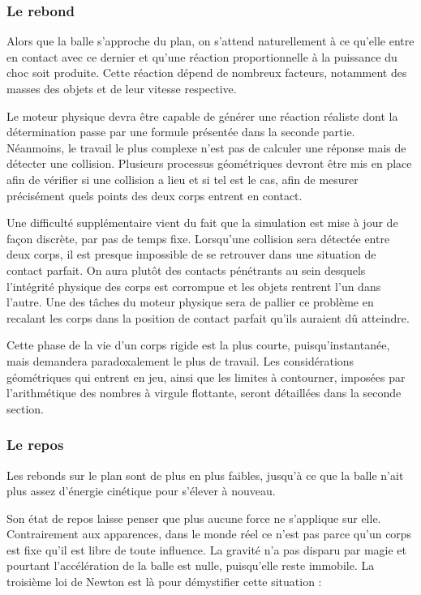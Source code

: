 \subsubsection{Le rebond}

Alors que la balle s'approche du plan, on s'attend
naturellement à ce qu'elle entre en contact avec ce dernier et qu'une
réaction proportionnelle à la puissance du choc soit produite. Cette
réaction dépend de nombreux facteurs, notamment des masses des objets
et de leur vitesse respective.

Le moteur physique devra être capable de générer une réaction réaliste
dont la détermination passe par une formule présentée dans la seconde
partie. Néanmoins, le travail le plus complexe n'est pas de calculer
une réponse mais de détecter une collision. Plusieurs processus
géométriques devront être mis en place afin de vérifier si une
collision a lieu et si tel est le cas, afin de mesurer précisément
quels points des deux corps entrent en contact.

Une difficulté supplémentaire vient du fait que la simulation est mise
à jour de façon discrète, par pas de temps fixe. Lorsqu'une collision
sera détectée entre deux corps, il est presque impossible de se
retrouver dans une situation de contact parfait. On aura plutôt des
contacts pénétrants au sein desquels l'intégrité physique des corps
est corrompue et les objets rentrent l'un dans l'autre. Une des tâches
du moteur physique sera de pallier ce problème en recalant les corps
dans la position de contact parfait qu'ils auraient dû atteindre.

Cette phase de la vie d'un corps rigide est la plus courte,
puisqu'instantanée, mais demandera paradoxalement le plus de
travail. Les considérations géométriques qui entrent en jeu, ainsi que
les limites à contourner, imposées par l'arithmétique des nombres à
virgule flottante, seront détaillées dans la seconde section.

\subsubsection{Le repos}

Les rebonds sur le plan sont de plus en plus faibles, jusqu'à ce que
la balle n'ait plus assez d'énergie cinétique pour s'élever à
nouveau.

Son état de repos laisse penser que plus aucune force ne s'applique
sur elle. Contrairement aux apparences, dans le monde réel ce n'est
pas parce qu'un corps est fixe qu'il est libre de toute influence. La
gravité n'a pas disparu par magie et pourtant l'accélération de la
balle est nulle, puisqu'elle reste immobile. La troisième loi de
Newton \cite{newton} est là pour démystifier cette situation :

